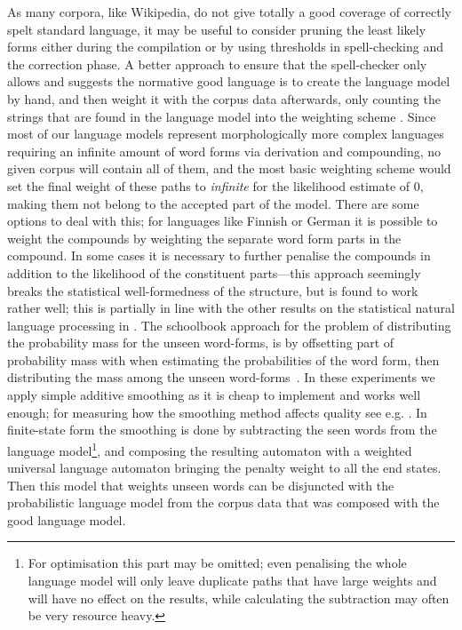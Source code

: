 \documentclass[a4paper,12pt]{article}
\begin{document}
As many corpora, like Wikipedia, do not give totally a good coverage of
correctly spelt standard language, it may be useful to consider pruning the
least likely forms either during the compilation or by using thresholds in
spell-checking and the correction phase. A better approach to ensure that the
spell-checker only allows and suggests the normative good language is to create
the language model by hand, and then weight it with the corpus data afterwards,
only counting the strings that are found in the language model into the
weighting scheme \cite[]{pirinen/2009/nodalida}. Since most of our language
models represent morphologically more complex languages requiring an infinite
amount of word forms via derivation and compounding, no given corpus will
contain all of them, and the most basic weighting scheme would set the final
weight of these paths to \emph{infinite} for the likelihood estimate of 0,
making them not belong to the accepted part of the model. There are some
options to deal with this; for languages like Finnish or German
\cite[]{schiller2006german} it is possible to weight the compounds by weighting
the separate word form parts in the compound.  In some cases it is necessary to
further penalise the compounds in addition to the likelihood of the constituent
parts---this approach seemingly breaks the statistical well-formedness of the
structure, but is found to work rather well; this is partially in line with the
other results on the statistical natural language processing in
\cite{brants2007large}. The schoolbook approach for the problem of distributing
the probability mass for the unseen word-forms, is by offsetting part of
probability mass with when estimating the probabilities of the word form, then
distributing the mass among the unseen word-forms~\cite[for a good introduction
to smoothing models we refer to][]{jurafsky2000speech}. In these experiments we
apply simple additive smoothing as it is cheap to implement and works well
enough; for measuring how the smoothing method affects quality see e.g.
\cite{chen1999empirical}. In finite-state form the smoothing is done by
subtracting the seen words from the language model\footnote{For optimisation
    this part may be omitted; even penalising the whole language model will
    only leave duplicate paths that have large weights and will have no effect
on the results, while calculating the subtraction may often be very resource
heavy.}, and composing the resulting automaton with a weighted universal
language automaton bringing the penalty weight to all the end states.  Then
this model that weights unseen words can be disjuncted with the probabilistic
language model from the corpus data that was composed with the good language
model.
\end{document}
